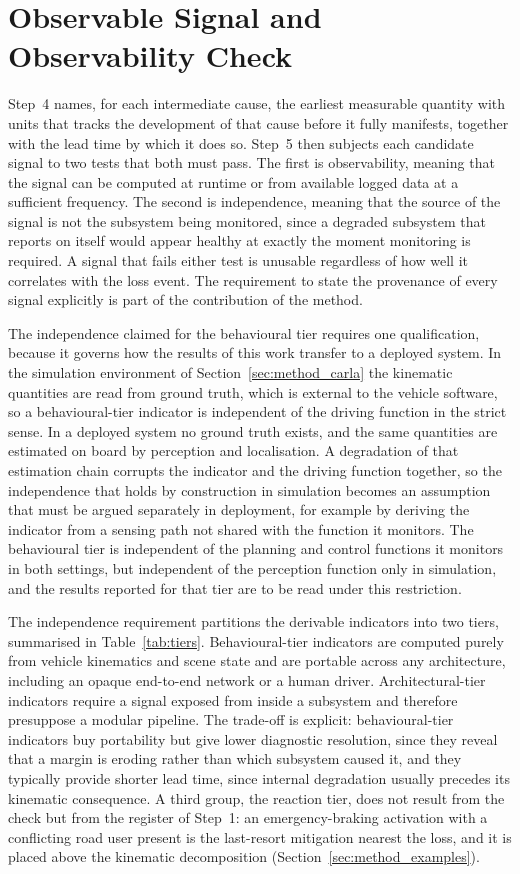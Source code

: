 \section{Observable Signal and Observability Check}
\label{sec:method_signal}

Step~4 names, for each intermediate cause, the earliest measurable quantity with units
that tracks the development of that cause before it fully manifests, together with the
lead time by which it does so. Step~5 then subjects each candidate signal to two tests
that both must pass. The first is observability, meaning that the signal can be
computed at runtime or from available logged data at a sufficient frequency. The
second is independence, meaning that the source of the signal is not the subsystem
being monitored, since a degraded subsystem that reports on itself would appear
healthy at exactly the moment monitoring is required. A signal that fails either test
is unusable regardless of how well it correlates with the loss event. The requirement to
state the provenance of every signal explicitly is part of the contribution of the
method.

The independence claimed for the behavioural tier requires one qualification, because it
governs how the results of this work transfer to a deployed system. In the simulation
environment of Section~\ref{sec:method_carla} the kinematic quantities are read from
ground truth, which is external to the vehicle software, so a behavioural-tier indicator
is independent of the driving function in the strict sense. In a deployed system no
ground truth exists, and the same quantities are estimated on board by perception and
localisation. A degradation of that estimation chain corrupts the indicator and the
driving function together, so the independence that holds by construction in simulation
becomes an assumption that must be argued separately in deployment, for example by
deriving the indicator from a sensing path not shared with the function it monitors. The
behavioural tier is independent of the planning and control functions it monitors in
both settings, but independent of the perception function only in simulation, and the
results reported for that tier are to be read under this restriction.

The independence requirement partitions the derivable indicators into two tiers,
summarised in Table~\ref{tab:tiers}. Behavioural-tier indicators are computed purely
from vehicle kinematics and scene state and are portable across any architecture,
including an opaque end-to-end network or a human driver. Architectural-tier indicators
require a signal exposed from inside a subsystem and therefore presuppose a modular
pipeline. The trade-off is explicit: behavioural-tier indicators buy portability but
give lower diagnostic resolution, since they reveal that a margin is eroding rather
than which subsystem caused it, and they typically provide shorter lead time, since
internal degradation usually precedes its kinematic consequence. A third group, the
reaction tier, does not result from the check but from the register of Step~1: an
emergency-braking activation with a conflicting road user present is the last-resort
mitigation nearest the loss, and it is placed above the kinematic decomposition
(Section~\ref{sec:method_examples}).

